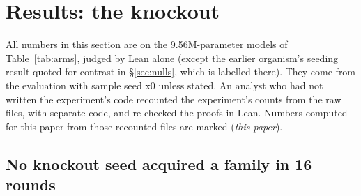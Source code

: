 \section{Results: the \sig{} knockout}
\label{sec:results}

All numbers in this section are on the 9.56M-parameter models of Table~\ref{tab:arms}, judged by Lean alone (except
the earlier organism's seeding result quoted for contrast in \S\ref{sec:nulls}, which is labelled there). They come
from the evaluation with sample seed x0 unless stated. An analyst who had not written the experiment's code recounted the
experiment's counts from the raw files, with separate code, and re-checked the proofs in Lean. Numbers computed for this
paper from those recounted files are marked (\emph{this paper}).

\subsection{No knockout seed acquired a family in 16 rounds}
\label{sec:primary}

